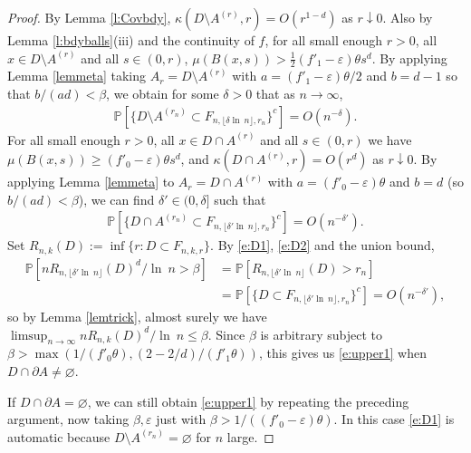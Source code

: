\documentclass[12pt]{article}
\renewcommand{\Pr}{\mathbb{P}}
\renewcommand{\emptyset}{\varnothing}
\newcommand{\eps}{\varepsilon}
\renewcommand{\log}{{\ln \:}}
\begin{document}
\begin{proof}
		By Lemma \ref{l:Covbdy},
	$\kappa(D \setminus A^{(r)},r) = O(r^{1-d})$
	as $r \downarrow 0$. Also by Lemma
		\ref{l:bdyballs}(iii)
	and the continuity of $f$,
		for all small enough $r >0$, 
		all $x \in D \setminus A^{(r)}$ and all
		$s \in (0,r)$,
		$\mu(B(x,s))
	> \frac12 (f'_1-  \eps) \theta s^d$.  
	By applying Lemma \ref{lemmeta}
	taking $A_r = D \setminus A^{(r)}$ with $a = (f'_1- \eps) \theta/2$
		and $b = d-1$ so that $b/(ad) < \beta$,
		we obtain for some $\delta >0$ that 
		as $n \to \infty$,
	\begin{align}
	\Pr[\{D \setminus A^{(r_n)} \subset F_{n,\lfloor \delta \log n \rfloor, r_n} \}^c ]  = O(n^{-\delta}).
		\label{e:D1}
	\end{align}
	For all small enough $r >0$,  all
		$x \in D \cap A^{(r)} $ and all $s \in (0,r)$
		we have $\mu(B(x,s)) \geq (f'_0- \eps) \theta s^d$,
	and $\kappa (D \cap A^{(r)},r) = O(r^d)$ as $r \downarrow 0$.
	By applying Lemma \ref{lemmeta} to $A_r = D \cap A^{(r)}$
		with $a = (f'_0 - \eps) \theta$ and $b=d$
		(so $b/(ad)  < \beta$), we can find $\delta' \in (0,\delta]$
	such that
	\begin{align}
	\Pr[\{D \cap A^{(r_n)} \subset F_{n,\lfloor \delta' \log n \rfloor, r_n} \}^c ]  = O(n^{-\delta'}).
		\label{e:D2}
\end{align}
	Set $R_{n,k}(D) := \inf\{r: D \subset F_{n,k,r}\}.$ 
	By \eqref{e:D1}, \eqref{e:D2}
		and the union bound,
	\begin{align*}
		\mathbb P[n R_{n,\lfloor \delta' \log n \rfloor}(D)^d /\log n 
		> \beta]
		& = \mathbb P[ R_{n,\lfloor \delta' \log n \rfloor}(D) > r_n ]
		\\
		& = \mathbb P[\{D \subset F_{n,\lfloor \delta' \log n
		\rfloor,r_n}\}^c ] = O(n^{-\delta'}),
	\end{align*}
	so by Lemma \ref{lemtrick}, almost surely 
		we have $ \limsup_{n \to \infty}
	n  R_{n,k}(D)^d/\log n \leq \beta$.
		Since $\beta $ is arbitrary subject to
		 $\beta > \max(1/(f'_0 \theta), (2-2/d)/(f'_1 \theta))$,
		 this gives us \eqref{e:upper1} when $D \cap \partial A 
		 \neq \emptyset$.
		 
		 If $D \cap \partial A = \emptyset$, we can still obtain
		 \eqref{e:upper1} by repeating the preceding argument,
		 now taking $\beta, \varepsilon$ just with
		  $\beta > 1/((f'_0 -\eps)\theta)$. In this case \eqref{e:D1}
		 is automatic because $D \setminus A^{(r_n)} = \emptyset$
		 for $n$ large.
\end{proof}
\end{document}
